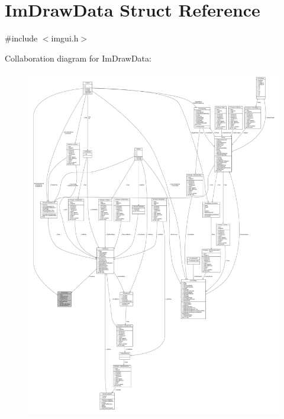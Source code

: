 \hypertarget{structImDrawData}{}\section{Im\+Draw\+Data Struct Reference}
\label{structImDrawData}


{\ttfamily \#include $<$imgui.\+h$>$}



Collaboration diagram for Im\+Draw\+Data\+:
\nopagebreak
\begin{figure}[H]
\begin{center}
\leavevmode
\includegraphics[width=350pt]{structImDrawData__coll__graph}
\end{center}
\end{figure}
